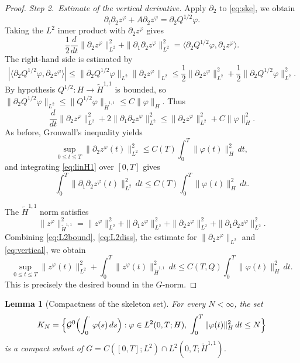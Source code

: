 \documentclass[11pt,a4paper,reqno]{amsart}
\newtheorem{lemma}[theorem]{Lemma}
\theoremstyle{definition}
\begin{document}
\begin{proof}
  \medskip
  \noindent\textit{Step 2.~Estimate of the vertical derivative.}
  Apply $\partial_2$ to \eqref{eq:ske}, we obtain
  \[
    \partial_t \partial_2 z^\varphi + A \partial_2 z^\varphi = \partial_2 Q^{1/2}\varphi .
  \]
  Taking the $L^2$ inner product with $\partial_2 z^\varphi$ gives
  \begin{equation}\label{eq:linH1}
    \frac12\frac{d}{dt}\|\partial_2 z^\varphi\|_{L^2}^2 + \|\partial_1\partial_2 z^\varphi\|_{L^2}^2
    = \langle \partial_2 Q^{1/2}\varphi, \partial_2 z^\varphi\rangle .
  \end{equation}
  The right-hand side is estimated by
  \[
    |\langle \partial_2 Q^{1/2}\varphi, \partial_2 z^\varphi\rangle|
    \le \|\partial_2 Q^{1/2}\varphi\|_{L^2} \|\partial_2 z^\varphi\|_{L^2}
    \le \frac12 \|\partial_2 z^\varphi\|_{L^2}^2 + \frac12 \|\partial_2 Q^{1/2}\varphi\|_{L^2}^2 .
  \]
  By hypothesis $Q^{1/2}:H\to\widetilde H^{1,1}$ is bounded, so $\|\partial_2 Q^{1/2}\varphi\|_{L^2}
  \le \|Q^{1/2}\varphi\|_{\widetilde H^{1,1}} \le C \|\varphi\|_{H}$.  Thus
  \[
    \frac{d}{dt}\|\partial_2 z^\varphi\|_{L^2}^2 + 2\|\partial_1\partial_2 z^\varphi\|_{L^2}^2
    \le \|\partial_2 z^\varphi\|_{L^2}^2 + C \|\varphi\|_{H}^2 .
  \]
  As before, Gronwall's inequality yields
  \[
    \sup_{0\le t\le T}\|\partial_2 z^\varphi(t)\|_{L^2}^2
    \le C(T) \int_0^T \|\varphi(t)\|_{H}^2\,dt ,
  \]
  and integrating \eqref{eq:linH1} over $[0,T]$ gives
  \begin{equation}\label{eq:vertical}
    \int_0^T \|\partial_1\partial_2 z^\varphi(t)\|_{L^2}^2\,dt
    \le C(T) \int_0^T \|\varphi(t)\|_{H}^2\,dt .
  \end{equation}


  The $\widetilde H^{1,1}$ norm satisfies
  \[
    \|z^\varphi\|_{\widetilde H^{1,1}}^2
    = \|z^\varphi\|_{L^2}^2 + \|\partial_1 z^\varphi\|_{L^2}^2
      + \|\partial_2 z^\varphi\|_{L^2}^2 + \|\partial_1\partial_2 z^\varphi\|_{L^2}^2 .
  \]
  Combining \eqref{eq:L2bound}, \eqref{eq:L2diss},
  the estimate for $\|\partial_2 z^\varphi\|_{L^2}$ and \eqref{eq:vertical}, we obtain
  \[
    \sup_{0\le t\le T}\|z^\varphi(t)\|_{L^2}^2 + \int_0^T \|z^\varphi(t)\|_{\widetilde H^{1,1}}^2\,dt
    \le C(T,Q) \int_0^T \|\varphi(t)\|_{H}^2\,dt .
  \]
  This is precisely the desired bound in the $G$-norm.
\end{proof}

\begin{lemma}[Compactness of the skeleton set]\label{lem:compact}
  For every $N<\infty$, the set
  \[
    K_N = \Bigl\{\mathcal G^0\Bigl(\int_0^\cdot \varphi(s)\,ds\Bigr) :
      \varphi\in L^2(0,T;H),\;\int_0^T \|\varphi(t)\|_H^2\,dt \le N\Bigr\}
  \]
  is a compact subset of $G = C([0,T];L^2)\cap L^2(0,T;\widetilde H^{1,1})$.
\end{lemma}
\end{document}
